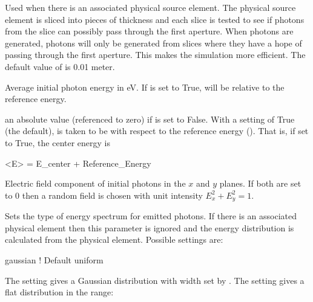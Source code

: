 {  \begin{description}
  \item[\vn{ds_slice}] \Newline
Used when there is an associated physical source element. The physical
source element is sliced into pieces of thickness  and
each slice is tested to see if photons from the slice can possibly
pass through the first aperture. When photons are generated, photons
will only be generated from slices where they have a hope of passing
through the first aperture. This makes the simulation more efficient.
The default value of  is 0.01 meter.

  \item[\vn{E_center}] \Newline
Average initial photon energy in eV. If 
is set to True,  will be relative to the reference
energy.

  \item[\vn{E_center_relative_to_ref}] \Newline
{} an absolute value (referenced to zero) if
 is set to False. With a setting of True
(the default),  is taken to be with respect to the
reference energy (). That is, if set to True, the
center energy  is
\begin{example}
  <E> = E_center + Reference_Energy
\end{example}

  \item[\vn{e_field_x}, \vn{e_field_y}] \Newline
Electric field component of initial photons in the $x$ and $y$ planes.
If both are set to 0 then a random field is chosen with unit intensity
$E_x^2 + E_y^2 = 1$.

  \item[\vn{energy_distribution}] \Newline
Sets the type of energy spectrum for emitted photons. If there is an
associated physical element then this parameter is ignored and the
energy distribution is calculated from the physical element. Possible
settings are:
\begin{example2}
  gaussian   ! Default
  uniform
\end{example2}
The  setting gives a Gaussian distribution with width
set by . The  setting gives a flat
distribution in the range:
\begin{example2}
\end{example2}


\end{description}}
